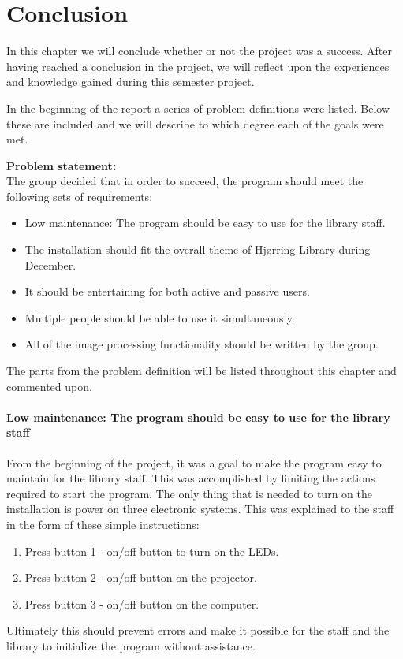 \chapter{Conclusion}

In this chapter we will conclude whether or not the project was a success. After having reached a conclusion in the project, we will reflect upon the experiences and knowledge gained during this semester project.

In the beginning of the report a series of problem definitions were listed. Below these are included and we will describe to which degree each of the goals were met.

\textbf{Problem statement:}\\
The group decided that in order to succeed, the program should meet the following sets of requirements:
\begin{itemize}
\item Low maintenance: The program should be easy to use for the library staff.
\item The installation should fit the overall theme of Hj{\o}rring Library during December.
\item It should be entertaining for both active and passive users.
\item Multiple people should be able to use it simultaneously.
\item All of the image processing functionality should be written by the group.
\end{itemize}

The parts from the problem definition will be listed throughout this chapter and commented upon.

\subsubsection{Low maintenance: The program should be easy to use for the library staff}
From the beginning of the project, it was a goal to make the program easy to maintain for the library staff. This was accomplished by limiting the actions required to start the program. The only thing that is needed to turn on the installation is power on three electronic systems. This was explained to the staff in the form of these simple instructions:
\begin{enumerate}
\item Press button 1 - on/off button to turn on the LEDs.
\item Press button 2 - on/off button on the projector.
\item Press button 3 - on/off button on the computer.
\end{enumerate}
Ultimately this should prevent errors and make it possible for the staff and the library to initialize the program without assistance.

